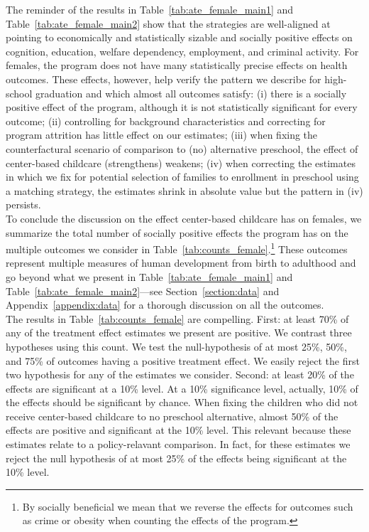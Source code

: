 \noindent The reminder of the results in Table~\ref{tab:ate_female_main1} and Table~\ref{tab:ate_female_main2} show that the strategies are well-aligned at pointing to economically and statistically sizable and socially positive effects on cognition, education, welfare dependency, employment, and criminal activity. For females, the program does not have many statistically precise effects on health outcomes. These effects, however, help verify the pattern we describe for high-school graduation and which almost all outcomes satisfy: (i) there is a socially positive effect of the program, although it is not statistically significant for every outcome; (ii) controlling for background characteristics and correcting for program attrition has little effect on our estimates; (iii) when fixing the counterfactural scenario of comparison to (no) alternative preschool, the effect of center-based childcare (strengthens) weakens; (iv) when correcting the estimates in which we fix for potential selection of families to enrollment in preschool using a matching strategy, the estimates shrink in absolute value but the pattern in (iv) persists.\\

\noindent To conclude the discussion on the effect center-based childcare has on females, we summarize the total number of socially positive effects the program has on the multiple outcomes we consider in Table~\ref{tab:counts_female}.\footnote{By socially beneficial we mean that we reverse the effects for outcomes such as crime or obesity when counting the effects of the program.} These outcomes represent multiple measures of human development from birth to adulthood and go beyond what we present in Table~\ref{tab:ate_female_main1} and Table~\ref{tab:ate_female_main2}---see Section~\ref{section:data} and Appendix~\ref{appendix:data} for a thorough discussion on all the outcomes.\\ 

\noindent The results in Table~\ref{tab:counts_female} are compelling. First: at least 70\% of any of the treatment effect estimates we present are positive. We contrast three hypotheses using this count. We test the null-hypothesis of at most 25\%, 50\%, and 75\% of outcomes having a positive treatment effect. We easily reject the first two hypothesis for any of the estimates we consider. Second: at least 20\% of the effects are significant at a 10\% level. At a 10\% significance level, actually, 10\% of the effects should be significant by chance. When fixing the children who did not receive center-based childcare to no preschool alternative, almost 50\% of the effects are positive and significant at the 10\% level. This relevant because these estimates relate to a policy-relavant comparison. In fact, for these estimates we reject the null hypothesis of at most 25\% of the effects being significant at the 10\% level.


